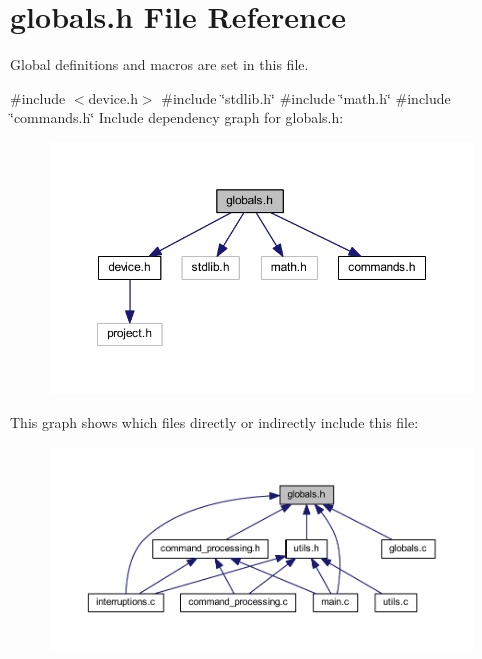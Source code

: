 \section{globals.\+h File Reference}
\label{globals_8h}


Global definitions and macros are set in this file.  


{\ttfamily \#include $<$device.\+h$>$}\newline
{\ttfamily \#include \char`\"{}stdlib.\+h\char`\"{}}\newline
{\ttfamily \#include \char`\"{}math.\+h\char`\"{}}\newline
{\ttfamily \#include \char`\"{}commands.\+h\char`\"{}}\newline
Include dependency graph for globals.\+h\+:\nopagebreak
\begin{figure}[H]
\begin{center}
\leavevmode
\includegraphics[width=350pt]{globals_8h__incl}
\end{center}
\end{figure}
This graph shows which files directly or indirectly include this file\+:\nopagebreak
\begin{figure}[H]
\begin{center}
\leavevmode
\includegraphics[width=350pt]{globals_8h__dep__incl}
\end{center}
\end{figure}
